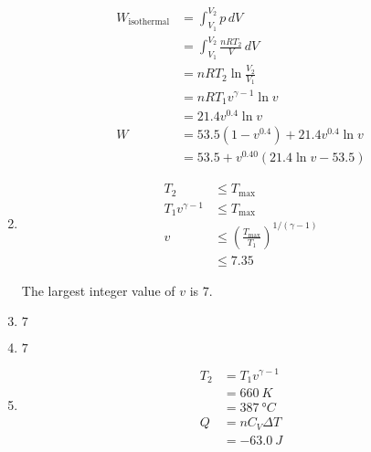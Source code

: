 \documentclass{article}
\begin{document}
\begin{enumerate}
\begin{align*}
          W_\text{isothermal}  & = \int_{V_1}^{V_2} p \,d V                        \\
                               & = \int_{V_1}^{V_2} \frac{n R T_2}{V} \,d V        \\
                               & = n R T_2 \ln \frac{V_2}{V_1}                     \\
                               & = n R T_1 v^{\gamma - 1} \ln v                    \\
                               & = 21.4 v^{0.4} \ln v                              \\
          W                    & = 53.5 (1 - v^{0.4}) + 21.4 v^{0.4} \ln v         \\
                               & = 53.5 + v^{0.40} (21.4 \ln v - 53.5)
        \end{align*}

  \item

        \begin{align*}
          T_2                & \le T_\text{max}                                               \\
          T_1 v^{\gamma - 1} & \le T_\text{max}                                               \\
          v                  & \le \left( \frac{T_\text{max}}{T_1} \right)^{1 / (\gamma - 1)} \\
                             & \le 7.35
        \end{align*}

        The largest integer value of $v$ is $7$.

  \item $7$

  \item $7$

  \item

        \begin{align*}
          T_2 & = T_1 v^{\gamma - 1}   \\
              & = \qty{660}{K}         \\
              & = \qty{387}{\degree C} \\
          Q   & = n C_V \Delta T       \\
              & = \qty{-63.0}{J}
        \end{align*}
\end{enumerate}

\setcounter{subsubsection}{62}
\end{document}
